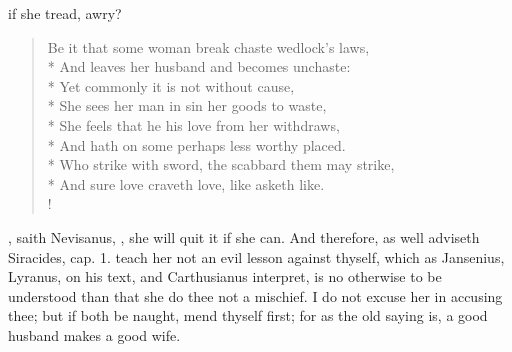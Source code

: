 if she tread, awry?
%
\begin{verse}%
Be it that some woman break chaste wedlock's laws,\\*
And leaves her husband and becomes unchaste:\\*
Yet commonly it is not without cause,\\*
She sees her man in sin her goods to waste,\\*
She feels that he his love from her withdraws,\\*
And hath on some perhaps less worthy placed.\\*
Who strike with sword, the scabbard them may strike,\\*
And sure love craveth love, like asketh like.\\!
\end{verse}%
%

, saith Nevisanus, , she
will quit it if she can. And therefore, as well adviseth Siracides,
cap.  1. teach her not an evil lesson against thyself, which as
Jansenius, Lyranus, on his text, and Carthusianus interpret, is no
otherwise to be understood than that she do thee not a mischief. I do
not excuse her in accusing thee; but if both be naught, mend thyself
first; for as the old saying is, a good husband makes a good wife.

